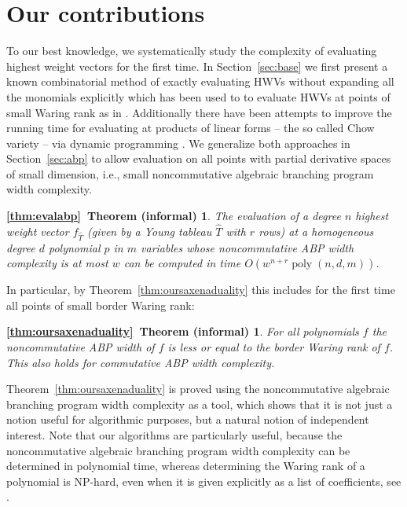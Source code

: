 \documentclass[10pt,a4paper]{article}
\numberwithin{equation}{section}
\newtheorem*{theorem*thm:evalabp}{\ref{thm:evalabp}~Theorem (informal)}
\newtheorem*{theorem*thm:oursaxenaduality}{\ref{thm:oursaxenaduality}~Theorem (informal)}
\theoremstyle{definition}
\DeclareMathOperator{\poly}{poly}
\begin{document}
\section{Our contributions}

To our best knowledge, we systematically study the complexity of evaluating highest weight vectors for the first time.
In Section~\ref{sec:base} we first present a known combinatorial method of exactly evaluating HWVs without expanding all the monomials explicitly which has been used to to evaluate HWVs at points of small Waring rank as in \cite{AIR:16, BI:17b}.
Additionally there have been attempts to improve the running time for evaluating at products of linear forms -- the so called Chow variety -- via dynamic programming \cite{DBLP:conf/icalp/DorflerIP19}.
We generalize both approaches in Section~\ref{sec:abp} to allow evaluation on all points with partial derivative spaces of small dimension, i.e., small noncommutative algebraic branching program width complexity.
\begin{theorem*thm:evalabp}
The evaluation of a degree $n$ highest weight vector $f_{\hat T}$ (given by a Young tableau ${\hat T}$ with $r$ rows) at a homogeneous degree $d$ polynomial $p$ in $m$ variables whose noncommutative ABP width complexity is at most $w$ can be computed in time $O(w^{n + r}\poly(n,d,m))$.
\end{theorem*thm:evalabp}
In particular, by Theorem~\ref{thm:oursaxenaduality} this includes for the first time all points of small border Waring rank:
\begin{theorem*thm:oursaxenaduality}
For all polynomials $f$ the noncommutative ABP width of $f$ is less or equal to the border Waring rank of $f$. This also holds for commutative ABP width complexity.
\end{theorem*thm:oursaxenaduality}
Theorem~\ref{thm:oursaxenaduality} is proved using the noncommutative algebraic branching program width complexity as a tool, which shows that it is not just a notion useful for algorithmic purposes, but a natural notion of independent interest.
Note that our algorithms are particularly useful, because the noncommutative algebraic branching program width complexity can be determined in polynomial time, whereas determining the Waring rank of a polynomial is NP-hard, even when it is given explicitly as a list of coefficients, see \cite{Shi:16}.
\end{document}
